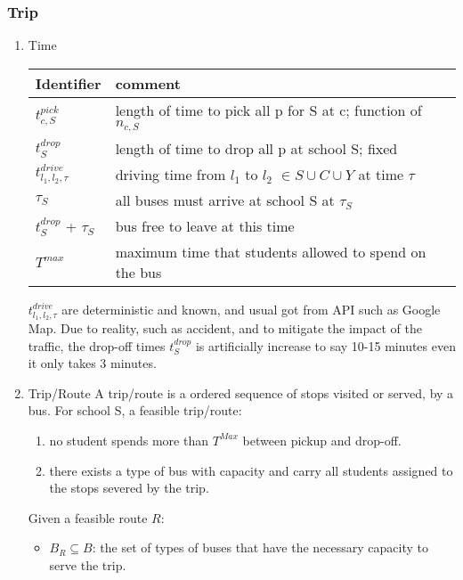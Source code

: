 \subsubsection{Trip}
\label{sec:org82671d1}
\begin{enumerate}
\item Time
\label{sec:orgb6ae6bc}
\begin{center}
\begin{tabular}{ll}
Identifier & comment\\
\hline
\(t_{c,S}^{pick}\) & length of time to pick all p for S at c; function of \(n_{c,S}\)\\
\(t_{S}^{drop}\) & length of time to drop all p at school S; fixed\\
\(t_{l_1,l_2,\tau}^{drive}\) & driving time from \(l_1\) to  \(l_2\) \(\in S \cup C \cup Y\) at time \(\tau\)\\
\(\tau_S\) & all buses must arrive at school S at \(\tau_S\)\\
\(t_{S}^{drop}\) + \(\tau_S\) & bus free to leave at this time\\
\(T^{max}\) & maximum time that students allowed to spend on the bus\\
\end{tabular}
\end{center}

\(t_{l_1,l_2,\tau}^{drive}\) are deterministic and known, and usual got from API
such as Google Map. Due to reality, such as accident, and to mitigate the impact
of the traffic, the drop-off times \(t_{S}^{drop}\) is artificially increase to
say 10-15 minutes even it only takes 3 minutes.

\item Trip/Route
\label{sec:orge254669}
A trip/route is a ordered sequence of stops visited or served, by a bus. 
For school S, a feasible trip/route:
\begin{enumerate}
\item no student spends more than \(T^{Max}\) between pickup and drop-off.
\item there exists a type of bus with capacity and carry all students assigned to
the stops severed by the trip.
\end{enumerate}

Given a feasible route \(R\):

\begin{itemize}
\item \(B_R \subseteq B\): the set of types of buses that have the necessary capacity to serve the trip.


\end{itemize}
\end{enumerate}
